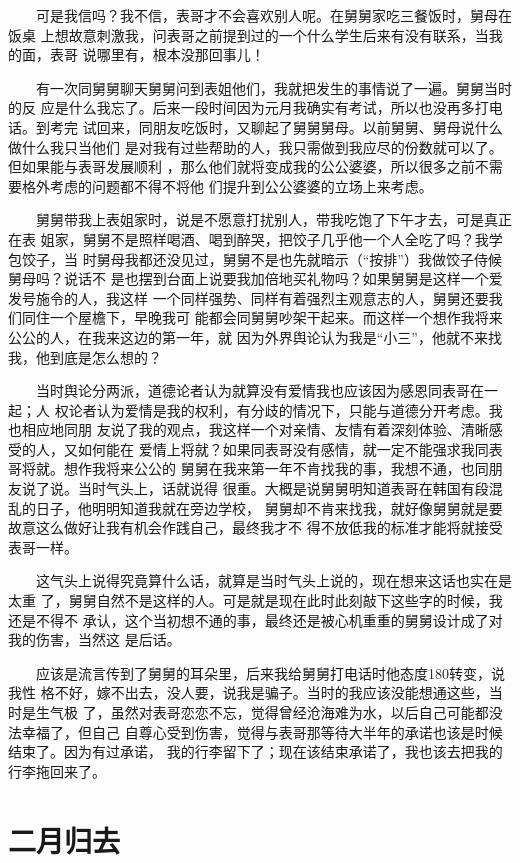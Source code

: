 \documentclass[12pt]{book}
\begin{document}
　　可是我信吗？我不信，表哥才不会喜欢别人呢。在舅舅家吃三餐饭时，舅母在饭桌
上想故意刺激我，问表哥之前提到过的一个什么学生后来有没有联系，当我的面，表哥
说哪里有，根本没那回事儿！

　　有一次同舅舅聊天舅舅问到表姐他们，我就把发生的事情说了一遍。舅舅当时的反
应是什么我忘了。后来一段时间因为元月我确实有考试，所以也没再多打电话。到考完
试回来，同朋友吃饭时，又聊起了舅舅舅母。以前舅舅、舅母说什么做什么我只当他们
是对我有过些帮助的人，我只需做到我应尽的份数就可以了。但如果能与表哥发展顺利
，那么他们就将变成我的公公婆婆，所以很多之前不需要格外考虑的问题都不得不将他
们提升到公公婆婆的立场上来考虑。

　　舅舅带我上表姐家时，说是不愿意打扰别人，带我吃饱了下午才去，可是真正在表
姐家，舅舅不是照样喝酒、喝到醉哭，把饺子几乎他一个人全吃了吗？我学包饺子，当
时舅母我都还没见过，舅舅不是也先就暗示（“按排”）我做饺子侍候舅母吗？说话不
是也摆到台面上说要我加倍地买礼物吗？如果舅舅是这样一个爱发号施令的人，我这样
一个同样强势、同样有着强烈主观意志的人，舅舅还要我们同住一个屋檐下，早晚我可
能都会同舅舅吵架干起来。而这样一个想作我将来公公的人，在我来这边的第一年，就
因为外界舆论认为我是“小三”，他就不来找我，他到底是怎么想的？

　　当时舆论分两派，道德论者认为就算没有爱情我也应该因为感恩同表哥在一起；人
权论者认为爱情是我的权利，有分歧的情况下，只能与道德分开考虑。我也相应地同朋
友说了我的观点，我这样一个对亲情、友情有着深刻体验、清晰感受的人，又如何能在
爱情上将就？如果同表哥没有感情，就一定不能强求我同表哥将就。想作我将来公公的
舅舅在我来第一年不肯找我的事，我想不通，也同朋友说了说。当时气头上，话就说得
很重。大概是说舅舅明知道表哥在韩国有段混乱的日子，他明明知道我就在旁边学校，
舅舅却不肯来找我，就好像舅舅就是要故意这么做好让我有机会作践自己，最终我才不
得不放低我的标准才能将就接受表哥一样。

　　这气头上说得究竟算什么话，就算是当时气头上说的，现在想来这话也实在是太重
了，舅舅自然不是这样的人。可是就是现在此时此刻敲下这些字的时候，我还是不得不
承认，这个当初想不通的事，最终还是被心机重重的舅舅设计成了对我的伤害，当然这
是后话。

　　应该是流言传到了舅舅的耳朵里，后来我给舅舅打电话时他态度180转变，说我性
格不好，嫁不出去，没人要，说我是骗子。当时的我应该没能想通这些，当时是生气极
了，虽然对表哥恋恋不忘，觉得曾经沧海难为水，以后自己可能都没法幸福了，但自己
自尊心受到伤害，觉得与表哥那等待大半年的承诺也该是时候结束了。因为有过承诺，
我的行李留下了；现在该结束承诺了，我也该去把我的行李拖回来了。
\section{二月归去}
\label{sec-8-4}
\end{document}
